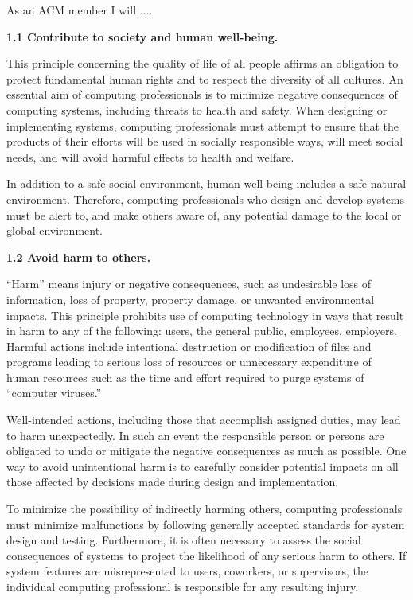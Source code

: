 As an ACM member I will ....

\vspace{.1in}\noindent\textbf{1.1 Contribute to society and human well-being.}

This principle concerning the quality of life of all people affirms an obligation to protect fundamental human rights and to respect the diversity of all cultures. An essential aim of computing professionals is to minimize negative consequences of computing systems, including threats to health and safety. When designing or implementing systems, computing professionals must attempt to ensure that the products of their efforts will be used in socially responsible ways, will meet social needs, and will avoid harmful effects to health and welfare.

In addition to a safe social environment, human well-being includes a safe natural environment. Therefore, computing professionals who design and develop systems must be alert to, and make others aware of, any potential damage to the local or global environment.

\vspace{.1in}\noindent\textbf{1.2 Avoid harm to others.}

``Harm'' means injury or negative consequences, such as undesirable loss of information, loss of property, property damage, or unwanted environmental impacts. This principle prohibits use of computing technology in ways that result in harm to any of the following: users, the general public, employees, employers. Harmful actions include intentional destruction or modification of files and programs leading to serious loss of resources or unnecessary expenditure of human resources such as the time and effort required to purge systems of ``computer viruses.''

Well-intended actions, including those that accomplish assigned duties, may lead to harm unexpectedly. In such an event the responsible person or persons are obligated to undo or mitigate the negative consequences as much as possible. One way to avoid unintentional harm is to carefully consider potential impacts on all those affected by decisions made during design and implementation.

To minimize the possibility of indirectly harming others, computing professionals must minimize malfunctions by following generally accepted standards for system design and testing. Furthermore, it is often necessary to assess the social consequences of systems to project the likelihood of any serious harm to others. If system features are misrepresented to users, coworkers, or supervisors, the individual computing professional is responsible for any resulting injury.

